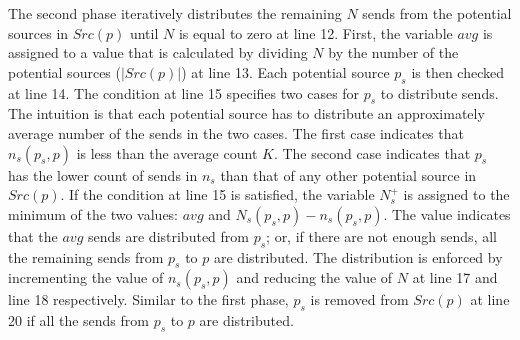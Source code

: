 The second phase iteratively distributes the remaining $N$ sends from the potential sources in $Src(p)$ until $N$ is equal to zero at line 12. 
First, the variable $avg$ is assigned to a value that is calculated by dividing $N$ by the number of the potential sources ($|Src(p)|$) at line 13. 
Each potential source $p_{s}$ is then checked at line 14. 
The condition at line 15 specifies two cases for $p_{s}$ to distribute sends. The intuition is that each potential source has to distribute an approximately average number of the sends in the two cases. The first case indicates that $n_s(p_{s},p)$ is less than the average count $K$. The second case indicates that $p_{s}$ has the lower count of sends in $n_s$ than that of any other potential source in $Src(p)$. 
If the condition at line 15 is satisfied, the variable $N_s^+$ is assigned to the minimum of the two values: $avg$ and $N_s(p_{s},p)-\mathit{n_s}(p_{s},p)$. The value indicates that the $avg$ sends are distributed from $p_s$; or, if there are not enough sends, all the remaining sends from $p_{s}$ to $p$ are distributed.  
The distribution is enforced by incrementing the value of $n_s(p_{s},p)$ and reducing the value of $N$ at line 17 and line 18 respectively. Similar to the first phase, $p_{s}$ is removed from $Src(p)$ at line 20 if all the sends from $p_{s}$ to $p$ are distributed.  

